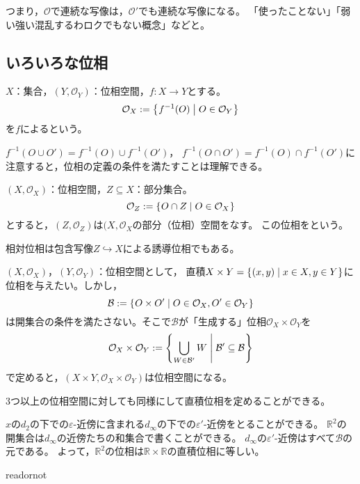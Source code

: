 \documentclass[uplatex]{jsarticle}
\begin{document}
つまり，$\mathcal{O}$で連続な写像は，$\mathcal{O}'$でも連続な写像になる。
{\footnotesize「使ったことない」「弱い強い混乱するわロクでもない概念」などと。}

\subsection{いろいろな位相}

\begin{teigi}[誘導位相]
  $X$：集合，$(Y,\mathcal{O}_{Y})$：位相空間，$f \colon X \longrightarrow Y$とする。
  \begin{equation}
    \mathcal{O}_{X} := \Set{\hspace{-1.8pt} f^{-1}(O) | O \in \mathcal{O}_{Y} \hspace{-1.8pt}}
  \end{equation}
  を$f$によるという。
\end{teigi}

$f^{-1} (O \cup O') = f^{-1} (O) \cup f^{-1} (O')$，
$f^{-1} (O \cap O') = f^{-1} (O) \cap f^{-1} (O')$に注意すると，位相の定義の条件を満たすことは理解できる。

\begin{teigi}[相対位相]
  $(X, \mathcal{O}_{X})$：位相空間，$Z \subseteq X$：部分集合。
  \begin{equation}
    \mathcal{O}_{Z} := \Set{\hspace{-1.8pt} O \cap Z | O \in \mathcal{O}_{X} \hspace{-1.8pt}}
  \end{equation}
  とすると，$(Z, \mathcal{O}_{Z})$は$(X, \mathcal{O}_{X}$の部分（位相）空間をなす。
  この位相をという。
\end{teigi}

相対位相は包含写像$Z \hookrightarrow X$による誘導位相でもある。

\sukima {}

$(X, \mathcal{O}_{X})$，$(Y, \mathcal{O}_{Y})$：位相空間として，
直積$X \times Y = \Set{\hspace{-1.8pt} (x,y) | x \in X, y \in Y \hspace{-1.8pt}}$に位相を与えたい。しかし，
\begin{equation}
  \mathcal{B} := \Set{\hspace{-1.8pt} O \times O' | O \in \mathcal{O}_{X}, O' \in \mathcal{O}_{Y} \hspace{-1.8pt}}
\end{equation}
は開集合の条件を満たさない。そこで$\mathcal{B}$が「生成する」位相$\mathcal{O}_{X} \times \mathcal{O}_{Y}$を
\begin{equation}
  \mathcal{O}_{X} \times \mathcal{O}_{Y} := \Set{\hspace{-1.8pt}  \bigcup_{W \in \mathcal{B}'} W | \mathcal{B}' \subseteq \mathcal{B} \hspace{-1.8pt}}
\end{equation}
で定めると，$(X \times Y, \mathcal{O}_{X} \times \mathcal{O}_{Y})$は位相空間になる。

3つ以上の位相空間に対しても同様にして直積位相を定めることができる。

\begin{rei}
  $x$の$d_{2}$の下での$\varepsilon$-近傍に含まれる$d_{\infty}$の下での$\varepsilon'$-近傍をとることができる。
  $\mathbb{R}^{2}$の開集合は$d_{\infty}$の近傍たちの和集合で書くことができる。
  $d_{\infty}$の$\varepsilon'$-近傍はすべて$\mathcal{B}$の元である。
  よって，$\mathbb{R}^{2}$の位相は$\mathbb{R} \times \mathbb{R}$の直積位相に等しい。
\end{rei}

\expandafter\ifx\csname readornot\endcsname\relax
  
\end{document}
